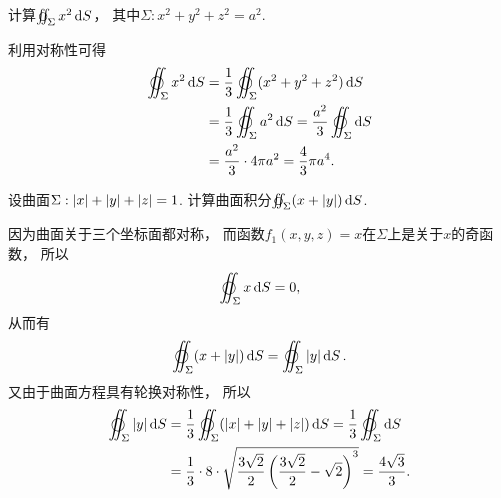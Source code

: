 \begin{example}
计算\(\varoiint_\Sigma x^2 \dd{S}\)，
其中\(\Sigma: x^2+y^2+z^2=a^2\).
\begin{solution}
利用对称性可得\begin{align*}
	\varoiint_\Sigma x^2 \dd{S}
	&= \frac{1}{3} \varoiint_\Sigma (x^2+y^2+z^2) \dd{S} \\
	&= \frac{1}{3} \varoiint_\Sigma a^2 \dd{S}
	= \frac{a^2}{3} \varoiint_\Sigma \dd{S} \\
	&= \frac{a^2}{3} \cdot 4\pi a^2
	= \frac{4}{3} \pi a^4.
\end{align*}
\end{solution}
\end{example}

\begin{example}
设曲面\(\Sigma: \abs{x}+\abs{y}+\abs{z}=1\).
计算曲面积分\(\varoiint_\Sigma (x+\abs{y}) \dd{S}\).
\begin{solution}
因为曲面关于三个坐标面都对称，
而函数\(f_1(x,y,z) = x\)在\(\Sigma\)上是关于\(x\)的奇函数，
所以\[
	\varoiint_\Sigma x \dd{S} = 0,
\]
从而有\[
	\varoiint_\Sigma (x+\abs{y}) \dd{S}
	= \varoiint_\Sigma \abs{y} \dd{S}.
\]
又由于曲面方程具有轮换对称性，
所以\begin{align*}
	\varoiint_\Sigma \abs{y} \dd{S}
	&= \frac13 \varoiint_\Sigma (\abs{x}+\abs{y}+\abs{z}) \dd{S}
	= \frac13 \varoiint_\Sigma \dd{S} \\
	&= \frac13 \cdot 8 \cdot \sqrt{\frac{3\sqrt2}2 \left( \frac{3\sqrt2}2 - \sqrt2 \right)^3}
	= \frac{4\sqrt3}3.
\end{align*}
\end{solution}
\end{example}

